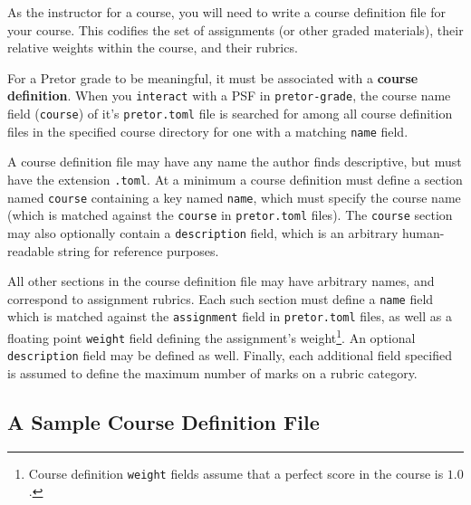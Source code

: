 \documentclass{book}
\begin{document}
As the instructor for a course, you will need to write a course definition file
for your course. This codifies the set of assignments (or other graded
materials), their relative weights within the course, and their rubrics.

For a Pretor grade to be meaningful, it must be associated with a
\textbf{course definition}. When you \texttt{interact} with a PSF in
\texttt{pretor-grade}, the course name field (\texttt{course}) of it's
\texttt{pretor.toml} file is searched for among all course definition files in
the specified course directory for one with a matching \texttt{name} field.


A course definition file may have any name the author finds descriptive, but
must have the extension \texttt{.toml}. At a minimum a course definition must
define a section named \texttt{course} containing a key named \texttt{name},
which must specify the course name (which is matched against the
\texttt{course} in \texttt{pretor.toml} files). The \texttt{course} section may
also optionally contain a \texttt{description} field, which is an arbitrary
human-readable string for reference purposes.

All other sections in the course definition file may have arbitrary names, and
correspond to assignment rubrics. Each such section must define a \texttt{name}
field which is matched against the \texttt{assignment} field in
\texttt{pretor.toml} files, as well as a floating point \texttt{weight} field
defining the assignment's weight\footnote{Course definition \texttt{weight}
fields assume that a perfect score in the course is $1.0$.}. An optional
\texttt{description} field may be defined as well. Finally, each additional
field specified is assumed to define the maximum number of marks on a rubric
category.


\subsection{A Sample Course Definition File}
\end{document}
